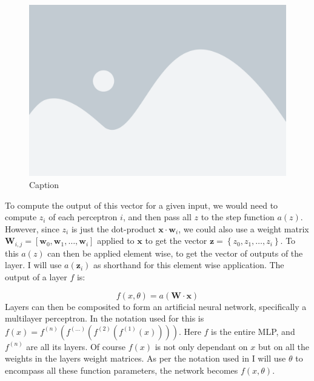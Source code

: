 \begin{figure}[H]
    \centering
    \includegraphics[width=0.6\linewidth]{figures/placeholder.png}
    \caption{Caption}
    \label{fig:my_label_1}
\end{figure}
\noindent
To compute the output of this vector for a given input, we would need to compute $z_i$ of each perceptron $i$, and then pass all $z$ to the step function $a(z)$. However, since $z_i$ is just the dot-product $\mathbf{x} \cdot \mathbf{w}_i$, we could also use a weight matrix $\mathbf{W}_{i, j} = \left[ \mathbf{w}_0, \mathbf{w}_1, \dots, \mathbf{w}_i \right]$ applied to $\mathbf{x}$ to get the vector $\mathbf{z} = \left\{ z_0, z_1, \dots, z_i \right\}$. To this $a(z)$ can then be applied element wise, to get the vector of outputs of the layer. I will use $a(\mathbf{z}_i)$ as shorthand for this element wise application. The output of a layer $f$ is:

\begin{equation}
    f(x, \theta) = a \left( \mathbf{W} \cdot \mathbf{x} \right)
\end{equation}
\noindent
Layers can then be composited to form an artificial neural network, specifically a multilayer perceptron. In \cite[p. 164]{Goodfellow-et-al-2016} the notation used for this is $f(x) = f^{(n)}(f^{(\dots)}(f^{(2)}(f^{(1)}(x))))$. Here $f$ is the entire MLP, and $f^{(n)}$ are all its layers. Of course $f(x)$ is not only dependant on $x$ but on all the weights in the layers weight matrices. As per the notation used in \cite{Goodfellow-et-al-2016} I will use $\theta$ to encompass all these function parameters, the network becomes $f(x, \theta)$. 